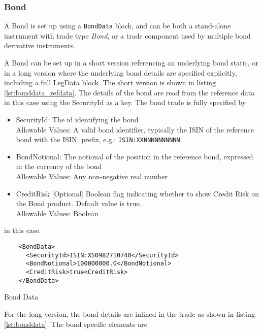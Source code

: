 \subsubsection{Bond}
\label{ss:bond}

A Bond is set up using a {\tt BondData} block, and can be both a stand-alone instrument with trade type \emph{Bond}, or a trade component used by multiple bond derivative instruments.

A Bond can be set up in a short version referencing an underlying bond static, or in a long version where the underlying bond details are specified explicitly, including a full LegData block.
The short version is shown in listing \ref{lst:bonddata_refdata}. The details of the
bond are read from the reference data in this case using the SecurityId as a key. The bond trade is fully specified by

\begin{itemize}
\item SecurityId: The id identifying the bond\\
  Allowable Values: A valid bond identifier, typically the ISIN of the reference bond with the ISIN: prefix, e.g.: \verb+ISIN:XXNNNNNNNNNN+
\item BondNotional: The notional of the position in the reference bond, expressed in the currency of the bond\\
  Allowable Values: Any non-negative real number
\item CreditRisk [Optional] Boolean flag indicating whether to show Credit Risk on the Bond product. Default value is true.\\
  Allowable Values: Boolean
\end{itemize}

in this case.

\begin{listing}[H]
\begin{verbatim}
    <BondData>
      <SecurityId>ISIN:XS0982710740</SecurityId>
      <BondNotional>100000000.0</BondNotional>
      <CreditRisk>true<CreditRisk>
    </BondData>
\end{verbatim}
\caption{Bond Data}
\label{lst:bonddata_refdata}
\end{listing}

For the long version, the bond details are inlined in the trade as shown in listing \ref{lst:bonddata}. The bond specific elements are

